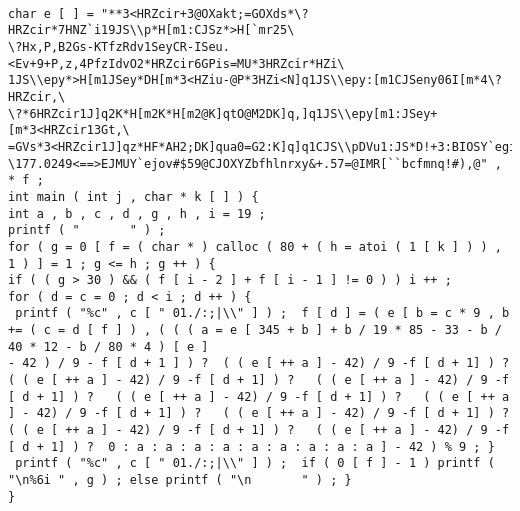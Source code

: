 \documentclass{beamer}
\begin{document}
\begin{frame}[fragile]
\begin{lstlisting}[style=CStyle]
 
char e [ ] = "**3<HRZcir+3@OXakt;=GOXds*\?HRZcir*7HNZ`i19JS\\p*H[m1:CJSz*>H[`mr25\
\?Hx,P,B2Gs-KTfzRdv1SeyCR-ISeu.<Ev+9+P,z,4PfzIdvO2*HRZcir6GPis=MU*3HRZcir*HZi\
1JS\\epy*>H[m1JSey*DH[m*3<HZiu-@P*3HZi<N]q1JS\\epy:[m1CJSeny06I[m*4\?HRZcir,\
\?*6HRZcir1J]q2K*H[m2K*H[m2@K]qtO@M2DK]q,]q1JS\\epy[m1:JSey+[m*3<HRZcir13Gt,\
=GVs*3<HRZcir1J]qz*HF*AH2;DK]qua0=G2:K]q]q1CJS\\pDVu1:JS*D!+3:BIOSY`egilqtxz\
\177.0249<==>EJMUY`ejov#$59@CJOXYZbfhlnrxy&+.57=@IMR[``bcfmnq!#),@" , * f ; 
int main ( int j , char * k [ ] ) { 
int a , b , c , d , g , h , i = 19 ; 
printf ( "       " ) ; 
for ( g = 0 [ f = ( char * ) calloc ( 80 + ( h = atoi ( 1 [ k ] ) ) , 1 ) ] = 1 ; g <= h ; g ++ ) { 
if ( ( g > 30 ) && ( f [ i - 2 ] + f [ i - 1 ] != 0 ) ) i ++ ; 
for ( d = c = 0 ; d < i ; d ++ ) { 
 printf ( "%c" , c [ " 01./:;|\\" ] ) ;  f [ d ] = ( e [ b = c * 9 , b += ( c = d [ f ] ) , ( ( ( a = e [ 345 + b ] + b / 19 * 85 - 33 - b / 40 * 12 - b / 80 * 4 ) [ e ] 
- 42 ) / 9 - f [ d + 1 ] ) ?  ( ( e [ ++ a ] - 42) / 9 -f [ d + 1] ) ?   ( ( e [ ++ a ] - 42) / 9 -f [ d + 1] ) ?   ( ( e [ ++ a ] - 42) / 9 -f [ d + 1] ) ?   ( ( e [ ++ a ] - 42) / 9 -f [ d + 1] ) ?   ( ( e [ ++ a ] - 42) / 9 -f [ d + 1] ) ?   ( ( e [ ++ a ] - 42) / 9 -f [ d + 1] ) ?   ( ( e [ ++ a ] - 42) / 9 -f [ d + 1] ) ?   ( ( e [ ++ a ] - 42) / 9 -f [ d + 1] ) ?  0 : a : a : a : a : a : a : a : a : a ] - 42 ) % 9 ; } 
 printf ( "%c" , c [ " 01./:;|\\" ] ) ;  if ( 0 [ f ] - 1 ) printf ( "\n%6i " , g ) ; else printf ( "\n       " ) ; } 
} \end{lstlisting}
\end{frame}
\end{document}
